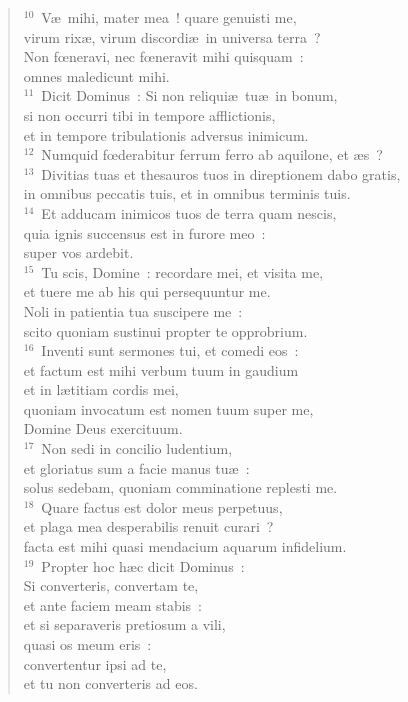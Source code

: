 \begin{flushleft}\begin{verse}${}^{10}$~V\ae\ mihi, mater mea~! quare genuisti me,\\ virum rix\ae , virum discordi\ae\ in universa terra~?\\ Non fœneravi, nec fœneravit mihi quisquam~:\\ omnes maledicunt mihi.\\
${}^{11}$~Dicit Dominus~: Si non reliqui\ae\ tu\ae\ in bonum,\\ si non occurri tibi in tempore afflictionis,\\ et in tempore tribulationis adversus inimicum.\\
${}^{12}$~Numquid fœderabitur ferrum ferro ab aquilone, et \ae s~?\\
${}^{13}$~Divitias tuas et thesauros tuos in direptionem dabo gratis,\\ in omnibus peccatis tuis, et in omnibus terminis tuis.\\
${}^{14}$~Et adducam inimicos tuos de terra quam nescis,\\ quia ignis succensus est in furore meo~:\\ super vos ardebit.\\
${}^{15}$~Tu scis, Domine~: recordare mei, et visita me,\\ et tuere me ab his qui persequuntur me.\\ Noli in patientia tua suscipere me~:\\ scito quoniam sustinui propter te opprobrium.\\
${}^{16}$~Inventi sunt sermones tui, et comedi eos~:\\ et factum est mihi verbum tuum in gaudium\\ et in l\ae titiam cordis mei,\\ quoniam invocatum est nomen tuum super me,\\ Domine Deus exercituum.\\
${}^{17}$~Non sedi in concilio ludentium,\\ et gloriatus sum a facie manus tu\ae~:\\ solus sedebam, quoniam comminatione replesti me.\\
${}^{18}$~Quare factus est dolor meus perpetuus,\\ et plaga mea desperabilis renuit curari~?\\ facta est mihi quasi mendacium aquarum infidelium.\\
${}^{19}$~Propter hoc h\ae c dicit Dominus~:\\ Si converteris, convertam te,\\ et ante faciem meam stabis~:\\ et si separaveris pretiosum a vili,\\ quasi os meum eris~:\\ convertentur ipsi ad te,\\ et tu non converteris ad eos.\\

\end{verse}
\end{flushleft}
